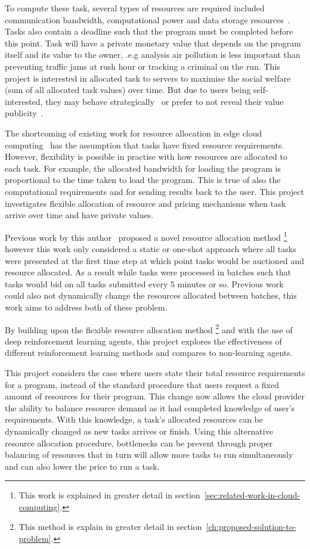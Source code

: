 To compute these task, several types of resources are required included communication bandwidth, computational power
and data storage resources~\citep{vaji_infocom}. Tasks also contain a deadline such that the program must be completed
before this point. Task will have a private monetary value that depends on the program itself and its value to the owner,
.e.g analysis air pollution is less important than preventing traffic jams at rush hour or tracking a criminal on the
run. This project is interested in allocated task to servers to maximise the social welfare (sum of all allocated
task values) over time. But due to users being self-interested, they may behave strategically~\citep{Bi2019} or prefer
to not reveal their value publicity~\citep{Pai2013}.

The shortcoming of existing work for resource allocation in edge cloud computing~\citep{vaji_infocom, Bi2019}
has the assumption that tasks have fixed resource requirements. However, flexibility is possible in practise
with how resources are allocated to each task. For example, the allocated bandwidth for loading the program is
proportional to the time taken to load the program. This is true of also the computational requirements and
for sending results back to the user. This project investigates flexible allocation of resource and pricing
mechanisms when task arrive over time and have private values.

Previous work by this author~\citep{FlexibleResourceAllocation} proposed a novel resource allocation method
\footnote{This work is explained in greater detail in section~\ref{sec:related-work-in-cloud-computing}.} however
this work only considered a static or one-shot approach where all tasks were presented at the first time step at
which point tasks would be auctioned and resource allocated. As a result while tasks were processed in batches such
that tasks would bid on all tasks submitted every 5 minutes or so. Previous work could also not dynamically change
the resources allocated between batches, this work aims to address both of these problem.

By building upon the flexible resource allocation method \footnote{This method is explain in greater detail in
section~\ref{ch:proposed-solution-to-problem}.} and with the use of deep reinforcement learning agents, this project
explores the effectiveness of different reinforcement learning methods and compares to non-learning agents.

This project considers the case where users state their total resource requirements for a program, instead of the
standard procedure that users request a fixed amount of resources for their program. This change now allows the cloud
provider the ability to balance resource demand as it had completed knowledge of user's requirements. With this
knowledge, a task's allocated resources can be dynamically changed as new tasks arrives or finish. Using this
alternative resource allocation procedure, bottlenecks can be prevent through proper balancing of resources that in
turn will allow more tasks to run simultaneously and can also lower the price to run a task.

